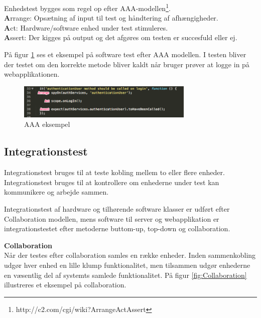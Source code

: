 Enhedstest bygges som regel op efter AAA-modellen\footnote{http://c2.com/cgi/wiki?ArrangeActAssert}.\\ 
\textbf{A}rrange: Opsætning af input til test og håndtering af afhængigheder. \\
\textbf{A}ct: Hardware/software enhed under test stimuleres. \\
\textbf{A}ssert: Der kigges på output og det afgøres om testen er succesfuld eller ej.

På  figur \ref{fig:aaa} ses et eksempel på software test efter AAA modellen. I testen bliver der testet om den korrekte metode bliver kaldt når bruger prøver at logge in på webapplikationen. 

\begin{figure}[H]
	\centering
	\includegraphics[width=0.75\textwidth]{Billeder/Test/aaa.png}
	\caption{AAA eksempel}
	\label{fig:aaa}
\end{figure}

\newpage

\subsection{Integrationstest} 
Integrationstest bruges til at teste kobling mellem to eller flere enheder. Integrationstest bruges til at kontrollere om enhederne under test kan kommunikere og arbejde sammen. 

Integrationstest af hardware og tilhørende software klasser er udført efter Collaboration modellen, mens software til server og webapplikation er integrationstestet efter metoderne buttom-up, top-down og collaboration. \\

\vspace{-0.4cm}

\textbf{Collaboration}\\
Når der testes efter collaboration samles en række enheder. Inden sammenkobling udgør hver enhed en lille klump funktionalitet, men tilsammen udgør enhederne en væsentlig del af systemts samlede funktionalitet.
På figur \ref{fig:Collaboration} illustreres et eksempel på collaboration.

